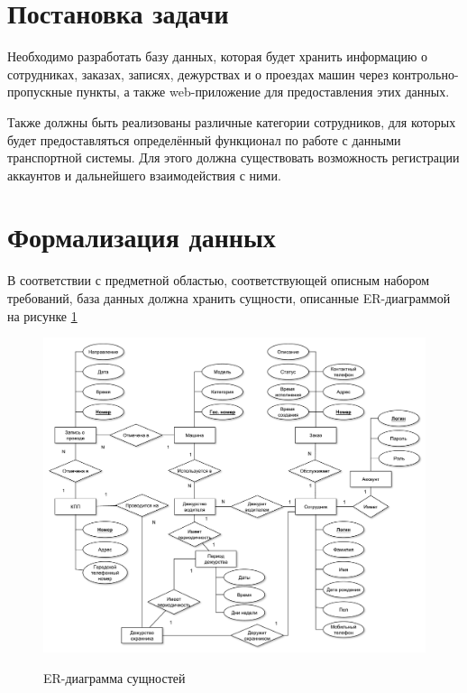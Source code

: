 \section{Постановка задачи}
Необходимо разработать базу данных, которая будет хранить информацию о сотрудниках, заказах, записях, дежурствах и о проездах машин через контрольно-пропускные пункты, а также web-приложение для предоставления этих данных.

Также должны быть реализованы различные категории сотрудников, для которых будет предоставляться определённый функционал по работе с данными транспортной системы. Для этого должна существовать возможность регистрации аккаунтов и дальнейшего взаимодействия с ними.

\newpage
\section{Формализация данных}
В соответствии с предметной областью, соответствующей описным набором требований, база данных должна хранить сущности, описанные ER-диаграммой на рисунке \ref{er_analitics}


\begin{figure}[ph!] 
	\begin{center}
		{\includegraphics[scale=0.45]{schemes/er.pdf}}
		\caption{ER-диаграмма сущностей}
		\label{er_analitics}
	\end{center}
\end{figure}

